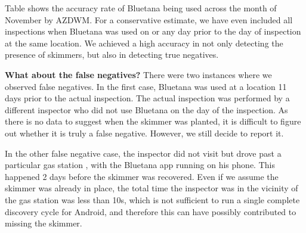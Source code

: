\begin{table}
\centering
\scriptsize
\resizebox{1\columnwidth}{!}{
\begin{tabular}{r|c}
\multicolumn{1}{c|}{} & \textbf{\#} \\
\hline
\multicolumn{1}{r|}{\# of reports}    &  27 \\
\multicolumn{1}{r|}{True positive}   &  5  \\

\multicolumn{1}{r|}{True negative} & 32  \\
\multicolumn{1}{r|}{False positive}   &  2   \\
\multicolumn{1}{r|}{False negative} & 2 \\
\hline
\end{tabular}
}
\caption{Our accuracy rates in Arizona across inspections done in one month}
\label{tab:arizona_falsepositive}
\end{table}

Table shows the accuracy rate of Bluetana being used across the month of November by AZDWM. For a conservative estimate, we have even included all inspections when Bluetana was used on or any day prior to the day of inspection at the same location. We achieved a high accuracy in not only detecting the presence of skimmers, but also in detecting true negatives. 

\textbf{What about the false negatives?} There were two instances where we observed false negatives. In the first case, Bluetana was used at a location 11 days prior to the actual inspection. The actual inspection was performed by a different inspector who did not use Bluetana on the day of the inspection. As there is no data to suggest when the skimmer was planted, it is difficult to figure out whether it is truly a false negative. However, we still decide to report it.

In the other false negative case, the inspector did not visit but drove past a particular gas station , with the Bluetana app running on his phone. This happened 2 days before the skimmer was recovered. Even if we assume the skimmer was already in place, the total time the inspector was in the vicinity of the gas station was less than 10s, which is not sufficient to run a single complete discovery cycle for Android, and therefore this can have possibly contributed to missing the skimmer.

